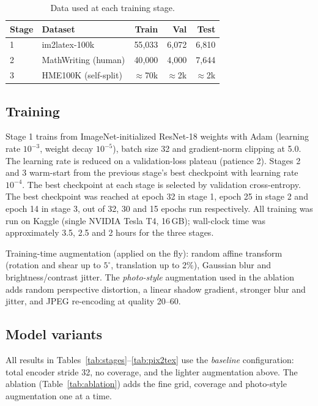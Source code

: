 \documentclass[conference]{IEEEtran}
\begin{document}
\begin{table}[t]
\caption{Data used at each training stage.}
\label{tab:data}
\centering
\begin{tabular}{llrrr}
\toprule
Stage & Dataset & Train & Val & Test \\
\midrule
1 & im2latex-100k & 55{,}033 & 6{,}072 & 6{,}810 \\
2 & MathWriting (human) & 40{,}000 & 4{,}000 & 7{,}644 \\
3 & HME100K (self-split) & $\approx$70k & $\approx$2k & $\approx$2k \\
\bottomrule
\end{tabular}
\end{table}

\subsection{Training}
Stage 1 trains from ImageNet-initialized ResNet-18 weights with Adam (learning rate $10^{-3}$, weight decay $10^{-5}$), batch size 32 and gradient-norm clipping at 5.0. The learning rate is reduced on a validation-loss plateau (patience 2). Stages 2 and 3 warm-start from the previous stage's best checkpoint with learning rate $10^{-4}$. The best checkpoint at each stage is selected by validation cross-entropy. The best checkpoint was reached at epoch 32 in stage 1, epoch 25 in stage 2 and epoch 14 in stage 3, out of 32, 30 and 15 epochs run respectively. All training was run on Kaggle (single NVIDIA Tesla T4, 16\,GB); wall-clock time was approximately 3.5, 2.5 and 2 hours for the three stages.

Training-time augmentation (applied on the fly):
random affine transform (rotation and shear up to $5^\circ$, translation up to 2\%), Gaussian blur and brightness/contrast jitter. The \emph{photo-style} augmentation used in the ablation adds random perspective distortion, a linear shadow gradient, stronger blur and jitter, and JPEG re-encoding at quality 20--60.

\subsection{Model variants}
All results in Tables~\ref{tab:stages}--\ref{tab:pix2tex} use the \emph{baseline} configuration: total encoder stride 32, no coverage, and the lighter augmentation above. The ablation (Table~\ref{tab:ablation}) adds the fine grid, coverage and photo-style augmentation one at a time.
\end{document}
